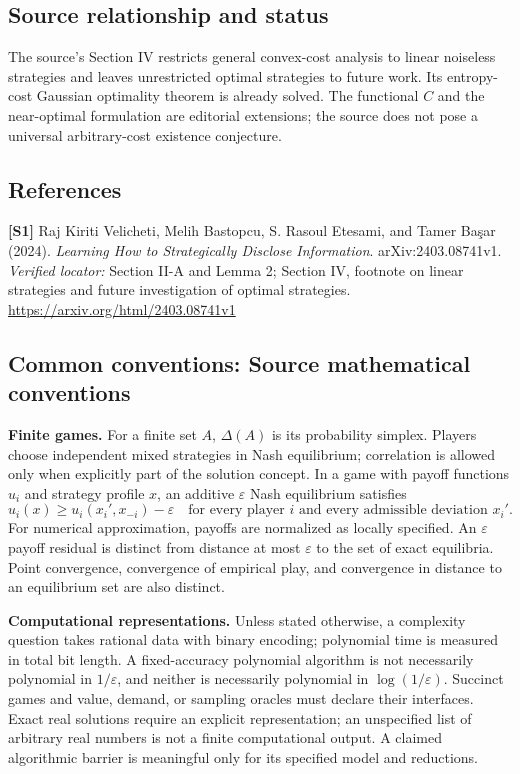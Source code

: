 \documentclass[11pt,a4paper]{article}
\begin{document}
\subsection*{Source relationship and status}
The source's Section IV restricts general convex-cost analysis to linear noiseless strategies and leaves unrestricted optimal strategies to future work. Its entropy-cost Gaussian optimality theorem is already solved. The functional $C$ and the near-optimal formulation are editorial extensions; the source does not pose a universal arbitrary-cost existence conjecture.
\subsection*{References}
\begingroup\footnotesize\raggedright
\textbf{[S1]} Raj Kiriti Velicheti, Melih Bastopcu, S. Rasoul Etesami, and Tamer Başar (2024). \emph{Learning How to Strategically Disclose Information}. arXiv:2403.08741v1. \textit{Verified locator:} Section II-A and Lemma 2; Section IV, footnote on linear strategies and future investigation of optimal strategies. \url{https://arxiv.org/html/2403.08741v1}
\par\endgroup

\subsection*{Common conventions: Source mathematical conventions}

\textbf{Finite games.} For a finite set $A$, $\Delta(A)$ is its probability
simplex. Players choose independent mixed strategies in Nash equilibrium;
correlation is allowed only when explicitly part of the solution concept.
In a game with payoff functions $u_i$ and strategy profile $x$, an additive
$\varepsilon$ Nash equilibrium satisfies
\[
 u_i(x)\geq u_i(x_i',x_{-i})-\varepsilon
 \quad\text{for every player $i$ and every admissible deviation $x_i'$}.
\]
For numerical approximation, payoffs are normalized as locally specified.
An $\varepsilon$ payoff residual is distinct from distance at most
$\varepsilon$ to the set of exact equilibria. Point convergence, convergence
of empirical play, and convergence in distance to an equilibrium set are
also distinct.

\textbf{Computational representations.} Unless stated otherwise, a complexity
question takes rational data with binary encoding; polynomial time is measured
in total bit length. A fixed-accuracy polynomial algorithm is not necessarily
polynomial in $1/\varepsilon$, and neither is necessarily polynomial in
$\log(1/\varepsilon)$. Succinct games and value, demand, or sampling oracles
must declare their interfaces. Exact real solutions require an explicit
representation; an unspecified list of arbitrary real numbers is not a
finite computational output. A claimed algorithmic barrier is meaningful
only for its specified model and reductions.
\end{document}
